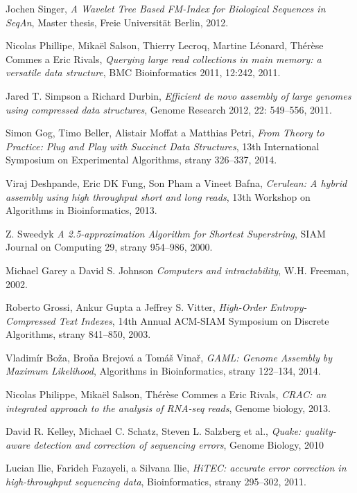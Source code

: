 \begin{thebibliography}{99}
        Jochen Singer,
        \emph{A Wavelet Tree Based FM-Index for Biological Sequences in SeqAn},
        Master thesis,
        Freie Universit\"{a}t Berlin,
        2012.
        
        Nicolas Phillipe, Mika\"{e}l Salson, Thierry Lecroq, Martine Léonard, Thér\`{e}se Commes a Eric Rivals,
        \emph{Querying large read collections in main memory: a versatile data structure},
        BMC Bioinformatics 2011, 12:242,
        2011.
        
        Jared T. Simpson a Richard Durbin,
        \emph{Efficient de novo assembly of large genomes using compressed data structures},
        Genome Research 2012, 22: 549--556,
        2011.
        
        Simon Gog, Timo Beller, Alistair Moffat a Matthias Petri,
        \emph{From Theory to Practice: Plug and Play with Succinct Data Structures},
        13th International Symposium on Experimental Algorithms, strany 326--337,
        2014.
        
        Viraj Deshpande, Eric DK Fung, Son Pham a Vineet Bafna,
        \emph{Cerulean: A hybrid assembly using high
throughput short and long reads},
        13th Workshop on Algorithms in Bioinformatics,
        2013.
        
        Z. Sweedyk
        \emph{A 2.5-approximation Algorithm for Shortest Superstring},
        SIAM Journal on Computing 29, strany 954--986,
        2000.

        Michael Garey a David S. Johnson    
        \emph{Computers and intractability},
        W.H. Freeman,
        2002.
        
        Roberto Grossi, Ankur Gupta a Jeffrey S. Vitter,
        \emph{High-Order Entropy-Compressed Text Indexes},
        14th Annual ACM-SIAM Symposium on Discrete Algorithms, strany 841--850,
        2003.
        
        Vladimír Boža, Broňa Brejová a Tomáš Vinař,
        \emph{GAML: Genome Assembly by Maximum Likelihood},
        Algorithms in Bioinformatics, strany 122--134,
        2014.  
        
        Nicolas Philippe, Mika{\"e}l Salson, Th{\'e}r{\`e}se Commes a Eric Rivals,
        \emph{CRAC: an integrated approach to the analysis of RNA-seq reads},
        Genome biology,
        2013.
        
        David R. Kelley, Michael C. Schatz, Steven L. Salzberg et al.,
        \emph{Quake: quality-aware detection and correction of sequencing errors},
        Genome Biology,
        2010
        
        Lucian Ilie, Farideh Fazayeli, a Silvana Ilie,
        \emph{HiTEC: accurate error correction in high-throughput sequencing data},
        Bioinformatics, strany 295--302,
        2011.        
        
\end{thebibliography}